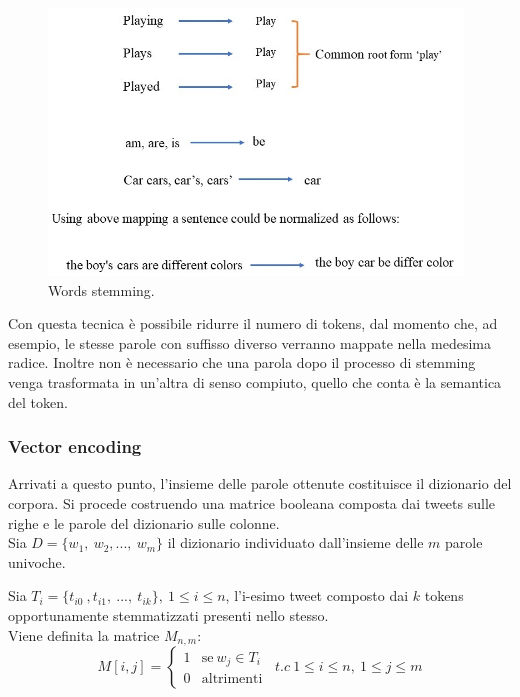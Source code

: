 \documentclass[oneside]{book}
\begin{document}
\begin{figure}[!h]
	\centering
	\includegraphics[width=11cm]{assets/stemming.jpg}

	\caption[Caption for LOF]{Words stemming.\footnotemark}
	\label{fig:stemming}
\end{figure}




Con questa tecnica è possibile ridurre il numero di tokens, dal momento che, ad esempio, le stesse parole con suffisso diverso verranno mappate nella medesima radice. Inoltre non è necessario che una parola dopo il processo di stemming venga trasformata in un'altra di senso compiuto, quello che conta è la semantica del token.


\subsubsection{Vector encoding}
Arrivati a questo punto, l'insieme delle parole ottenute costituisce il dizionario del corpora. Si procede costruendo una matrice booleana composta dai tweets sulle righe e le parole del dizionario sulle colonne.\\

Sia $D = \{w_1,\ w_2, ...,\ w_m\}$ il dizionario individuato dall'insieme delle $m$ parole univoche.

Sia $T_i = \{t_{i0}\ ,t_{i1},\ ...,\ t_{ik}\}, \ 1 \leq i \leq n$, l'i-esimo tweet composto dai $k$ tokens opportunamente stemmatizzati presenti nello stesso.\\
Viene definita la matrice $M_{n,m}$:
\[
M[i,j] =
\begin{cases}
1 & \text{se}\ w_j \in T_i\\
0 & \text{altrimenti}
\end{cases}
\ \;t.c\ 1\leq i\leq n,\ 1 \leq j \leq m
\]
\end{document}
